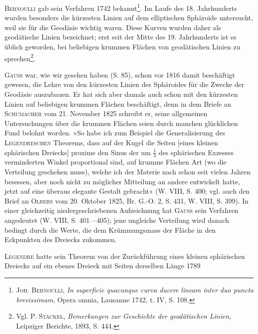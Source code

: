 \textsc{Bernoulli} gab sein Verfahren 1742 bekannt\footnote{\textsc{Joh. Bernoulli}, \textit{In superficie quacunque curva ducere lineam inter duo puncta brevissimam}, Opera omnia, Lausanne 1742, t. IV, S. 108.}. Im Laufe des 18. Jahrhunderts
wurden besonders die kürzesten Linien auf dem elliptischen Sphäroide untersucht,
weil sie für die Geodäsie wichtig waren. Diese Kurven wurden daher
als geodätische Linien bezeichnet; erst seit der Mitte des 19. Jahrhunderts ist
es üblich geworden, bei beliebigen krummen Flächen von geodätischen Linien
zu sprechen\footnote{Vgl. \textsc{P. Stäckel}, \textit{Bemerkungen zur Geschichte der geodätischen Linien}, Leipziger Berichte, 1893, S. 444.}.
\par
\textsc{Gauss} war, wie wir gesehen haben (S. 85), schon vor 1816 damit beschäftigt
gewesen, die Lehre von den kürzesten Linien des Sphäroides für die
Zwecke der Geodäsie auszubauen. Er hat sich aber damals auch schon mit
den kürzesten Linien auf beliebigen krummen Flächen beschäftigt, denn in
dem Briefe an \textsc{Schumacher} vom 21. November 1825 schreibt er, seine allgemeinen
Untersuchungen über die krummen Flächen seien durch manchen
glücklichen Fund belohnt worden. »So habe ich zum Beispiel die Generalisierung
des \textsc{Legendreschen} Theorems, dass auf der Kugel die Seiten [eines
kleinen sphärischen Dreiecks] proxime den Sinus der um \(\frac{1}{3}\) des sphärischen
Exzesses verminderten Winkel proportional sind, auf krumme Flächen 
\clearpage{}\setcounter{footnote}{0}
\noindent Art (wo die Verteilung  geschehen muss), welche ich der Materie
nach schon seit vielen Jahren besessen, aber noch nicht zu möglicher Mitteilung
an andere entwickelt hatte, jetzt auf eine überaus elegante Gestalt
gebracht« (W. VIII, S. 400; vgl. auch den Brief an \textsc{Olbers} vom 20. Oktober
1825, Br. G.-O. 2, S. 431, W. VIII, S. 399). In einer gleichzeitig niedergeschriebenen
Aufzeichnung hat \textsc{Gauss} sein Verfahren angedeutet (W. VIII,
S. 401—405); jene ungleiche Verteilung wird danach bedingt durch die Werte,
die dem Krümmungsmass der Fläche in den Eckpunkten des Dreiecks zukommen.
\par
\textsc{Legendre} hatte sein Theorem von der Zurückführung eines kleinen sphärischen
Dreiecks auf ein ebenes Dreieck mit Seiten derselben Länge 1789
